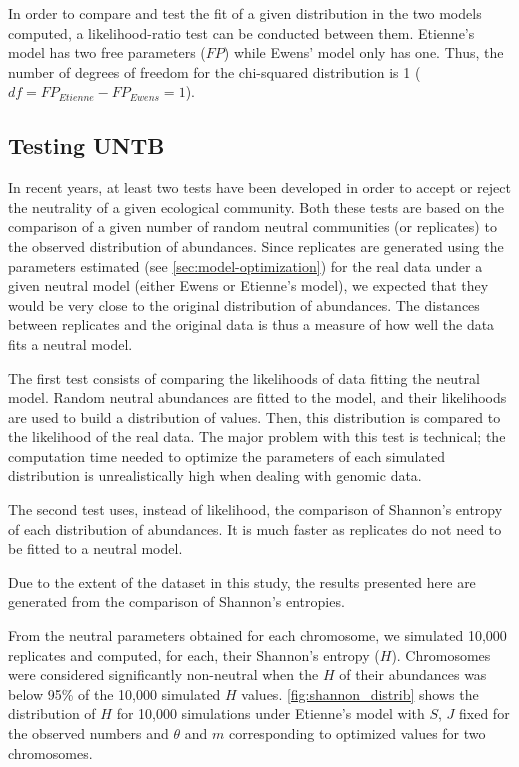 In order to compare and test the fit of a given distribution in the two models computed, a likelihood-ratio test \cite{Wilks1938} can be conducted between them. Etienne's model has two free parameters ($FP$) while Ewens' model only has one. Thus, the number of degrees of freedom for the chi-squared distribution is 1 ($df=FP_{Etienne}-FP_{Ewens}=1$).

\subsection{Testing UNTB}
\label{sec:testing-untb}

In recent years, at least two tests have been developed in order to accept or reject the neutrality of a given ecological community. Both these tests are based on the comparison of a given number of random neutral communities (or replicates) to the observed distribution of abundances. Since replicates are generated using the parameters estimated (see \autoref{sec:model-optimization}) for the real data under a given neutral model (either Ewens or Etienne's model), we expected that they would be very close to the original distribution of abundances. The distances between replicates and the original data is thus a measure of how well the data fits a neutral model.

The first test \cite{Etienne2007} consists of comparing the likelihoods of data fitting the neutral model. Random neutral abundances are fitted to the model, and their likelihoods are used to build a distribution of values. Then, this distribution is compared to the likelihood of the real data. The major problem with this test is technical; the computation time needed to optimize the parameters of each simulated distribution is unrealistically high when dealing with genomic data.

The second test \cite{Jabot2011} uses, instead of likelihood, the comparison of Shannon's entropy \cite{Shannon1948} of each distribution of abundances. It is much faster as replicates do not need to be fitted to a neutral model.

Due to the extent of the dataset in this study, the results presented here are generated from the comparison of Shannon's entropies.

From the neutral parameters obtained for each chromosome, we simulated 10,000 replicates and computed, for each, their Shannon's entropy ($H$). Chromosomes were considered significantly non-neutral when the $H$ of their abundances was below 95\% of the 10,000 simulated $H$ values. \autoref{fig:shannon_distrib} shows the distribution of $H$ for 10,000 simulations under Etienne's model with $S$, $J$ fixed for the observed numbers and $\theta$ and $m$ corresponding to optimized values for two chromosomes.

